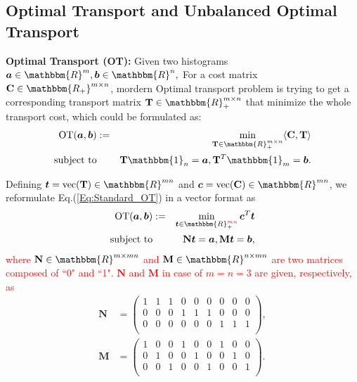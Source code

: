 \documentclass[twoside]{article}
\theoremstyle{plain}
\newcommand{\tranT}{T}
\newcommand{\R}{\mathbbm{R}}
\newcommand{\one}{\mathbbm{1}}
\newcommand{\mat}[1]{\mathbf{#1}}
\renewcommand{\vec}[1]{\bm{#1}}
\newcommand{\changeHK}[1]{\textcolor{red}{#1}}
\begin{document}
\subsection{Optimal Transport and Unbalanced Optimal Transport}
{\bf Optimal Transport (OT):} Given two histograms $\vec{a}\in \R^{m}, \vec{b} \in \R^{n},$ For a cost matrix $\mat{C} \in \mathbbm{R_{+}}^{m \times n}$, mordern Optimal transport problem is trying to get a corresponding transport matrix $\mat{T} \in \R_{+}^{m \times n}$ that minimize the whole transport cost, which could be formulated as:
\begin{eqnarray}
\label{Eq:Standard_OT}
\operatorname{OT}(\vec{a},\vec{b}) &:=& \min_{ \mat{T} \in \R_{+}^{m \times n}} \langle \mat{C}, \mat{T} \rangle \\
\text{subject\ to}&& \mat{T} \one_n= \vec{a}, \mat{T}^{T}\one_m = \vec{b}. \notag
\end{eqnarray}

Defining $\vec{t} = \text{vec}({\mat{T}}) \in \mathbbm{R}^{mn}$ and $\vec{c} = \text{vec}({\mat{C}}) \in \mathbbm{R}^{mn}$, we reformulate Eq.(\ref{Eq:Standard_OT}) in a vector format as
\begin{eqnarray}
\label{Eq:Vector_OT}
\operatorname{OT}(\vec{a},\vec{b}) &:=& \min_{\vec{t} \in \R_{+}^{\changeHK{mn}}} \vec{c}^{\tranT}\vec{t} \\
\text{subject\ to}&& \mat{N}\vec{t} = \vec{a}, \mat{M}\vec{t} = \vec{b}, \notag
\end{eqnarray}
\changeHK{where $\mat{N} \in \R^{m \times mn}$ and $\mat{M} \in \R^{n \times mn}$ are two matrices composed of ``0" and ``1". $\mat{N}$ and $\mat{M}$ in case of $m=n=3$ are given, respectively, as}
\begin{equation*}
\begin{split}
\mat{N}&=\begin{pmatrix}
1&1&1& 0& 0& 0& 0& 0&0\\
0 & 0& 0&1&1&1& 0& 0&0\\
0 & 0& 0& 0& 0& 0&1&1&1\\
\end{pmatrix},\\
\mat{M}&=\begin{pmatrix}
 1& 0& 0&1& 0& 0&1& 0&0\\
 0&1& 0& 0&1& 0& 0&1&0\\
 0& 0&1& 0& 0&1& 0& 0&1\\
 \end{pmatrix}.
  \end{split}
 \end{equation*}
 
\end{document}
